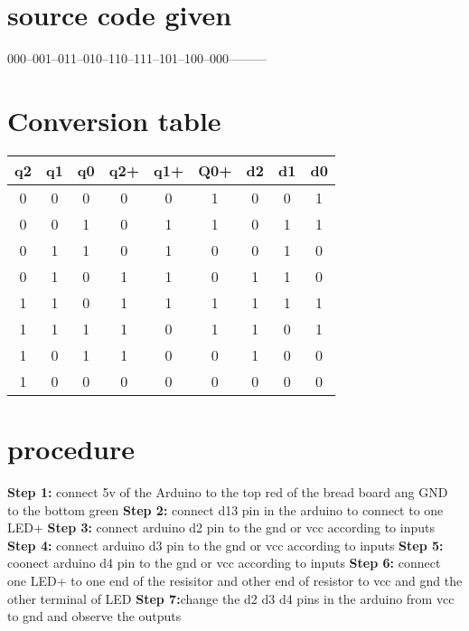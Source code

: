\documentclass[a4paper,10pt,twocolumn]{article}
\begin{document}
\section{source code given}
000--001--011--010--110--111--101--100--000---------

\section{Conversion table}

    \centering
\begin{tabular}{ |c |c |c |c |c |c |c |c |c |}
\hline
\newline
\textbf{q2} & \textbf{q1} & \textbf{q0} & \textbf{q2+} & \textbf{q1+} & \textbf{Q0+} & \textbf{d2}& \textbf{d1}& \textbf{d0}\\
\hline
 0 & 0 & 0 &0 & 0 & 1 &0 & 0 &1 \\  
 0 & 0 & 1 &0 & 1 & 1 &0 & 1 &1\\ 
 0 & 1 & 1 &0 & 1 & 0 &0 & 1 &0\\ 
 0 & 1 & 0 &1 & 1 & 0 &1 & 1 &0\\ 
 1 & 1 & 0 &1 & 1 & 1 &1 & 1 &1\\ 
 1 & 1 & 1 &1 & 0 & 1 &1 & 0 &1\\ 
 1 & 0 & 1 &1 & 0 & 0 &1 & 0 &0\\ 
 1 & 0 & 0 &0 & 0 & 0 &0 & 0 &0\\ 
 \hline
 \end{tabular}
\label{conversion table}

\section*{procedure}
\textbf{Step 1:} connect 5v of the Arduino to the top red of the bread board ang GND to the bottom green
\hfill \break
\textbf{Step 2:} connect d13 pin in the arduino to connect to one LED+
\hfill \break
\textbf{Step 3:} connect arduino d2 pin to the gnd or vcc according to inputs
\hfill \break
\textbf{Step 4:} connect arduino d3 pin to the gnd or vcc according to inputs
\hfill \break
\textbf{Step 5:} coonect arduino d4 pin to the gnd or vcc according to inputs
\hfill \break
\textbf{Step 6:} connect one LED+ to one end of the resisitor and other end of resistor to vcc and gnd the other terminal of LED
\hfill \break
\textbf{Step 7:}change the d2 d3 d4 pins in the arduino from vcc to gnd and observe the outputs
\hfill \break
\end{document}
